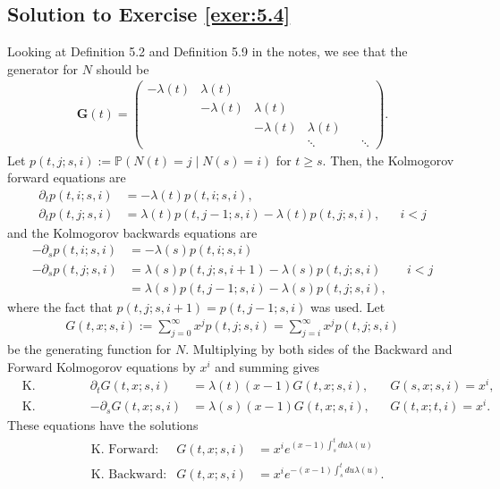 \documentclass[12pt]{book}
\numberwithin{equation}{chapter}
\theoremstyle{plain}
\numberwithin{theorem}{section}
\theoremstyle{definition}
\numberwithin{exercise}{chapter}
\newcommand{\<}{\langle}
\renewcommand{\>}{\rangle}
\renewcommand{\(}{\left(}
\renewcommand{\)}{\right)}
\renewcommand{\[}{\left[}
\renewcommand{\]}{\right]}
\newcommand\Pb{\mathds{P}}
\newcommand\Gv{\pmb{G}}
\renewcommand\d{\partial}
\begin{document}
\subsection*{Solution to Exercise \ref{exer:5.4}}
Looking at Definition 5.2 and Definition 5.9 in the notes, we see that the generator for $N$ should be
\begin{align}
\Gv(t)
	= 
	\begin{pmatrix}
	-\lambda(t) & \lambda (t) \\
	 & - \lambda(t) & \lambda(t) \\
	 & & - \lambda(t) & \lambda(t) \\
	 & & & \ddots && \ddots
	\end{pmatrix}.
\end{align}
Let $p(t,j;s,i) := \Pb(N(t) = j \mid N(s) = i)$ for $t \geq s$. Then, the Kolmogorov forward equations 
are 
\begin{align}
\d_t p(t,i; s,i)
	&= - \lambda(t) p(t,i;s,i), \\
\d_t p(t,j;s,i)
	&= \lambda(t) p(t,j-1;s,i) - \lambda(t) p(t,j;s,i), 
	&& i < j
\end{align}
and the Kolmogorov backwards equations are
\begin{align}
-\d_s p(t,i;s,i)
	&= -\lambda(s) p(t,i;s,i) \\
-\d_s p(t,j;s,i)
	&= \lambda(s) p(t,j;s,i+1) - \lambda(s) p(t,j;s,i)
	&& i<j \\
	&= \lambda(s) p(t,j-1;s,i) - \lambda(s) p(t,j;s,i),
\end{align}
where the fact that $p(t,j;s,i+1) = p(t,j-1;s,i)$ was used. Let 
\begin{align}
G(t,x;s,i)
	:= \sum_{j=0}^\infty x^j p(t,j;s,i)
	= \sum_{j=i}^\infty x^j p(t,j;s,i)
\end{align}
be the generating function for $N$. Multiplying by both sides of the Backward and Forward Kolmogorov equations by $x^i$ 
and summing gives
\begin{align}
&\text{K. Forward:}
& \d_t G(t,x;s,i)
	&= \lambda(t) ( x-1) G(t,x;s,i),
&& G(s,x;s,i) 
	= x^i, \\
&\text{K. Backward:}
& -\d_s G(t,x;s,i)
	&= \lambda(s) (x - 1) G(t,x;s,i),
&& G(t,x;t,i)
	= x^i. 
\end{align}
These equations have the solutions
\begin{align}
&\text{K. Forward:}
& G(t,x;s,i)
	&= x^i e^{(x - 1) \int_s^t du \lambda (u) } \\
&\text{K. Backward:}
& G(t,x;s,i)
	&= x^i e^{-(x - 1) \int_s^t du \lambda (u) }.
\end{align}
\end{document}
